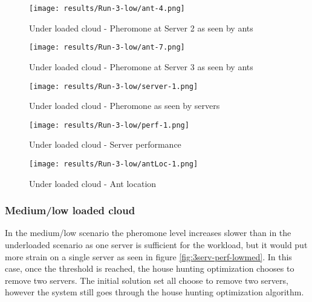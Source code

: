 \begin{figure}
	\centering
		\texttt{[image: results/Run-3-low/ant-4.png]}
	\caption{Under loaded cloud - Pheromone at Server 2 as seen by ants}
	\label{fig:3serv-ant4-low}
\end{figure}

\begin{figure}
	\centering
		\texttt{[image: results/Run-3-low/ant-7.png]}
	\caption{Under loaded cloud - Pheromone at Server 3 as seen by ants}
	\label{fig:3serv-ant7-low}
\end{figure}

\begin{figure}
	\centering
		\texttt{[image: results/Run-3-low/server-1.png]}
	\caption{Under loaded cloud - Pheromone as seen by servers}
	\label{fig:3serv-pher-low}
\end{figure}

\begin{figure}
	\centering
		\texttt{[image: results/Run-3-low/perf-1.png]}
	\caption{Under loaded cloud - Server performance}
	\label{fig:3serv-perf-low}
\end{figure}

\begin{figure}
	\centering
		\texttt{[image: results/Run-3-low/antLoc-1.png]}
	\caption{Under loaded cloud - Ant location}
	\label{fig:3serv-antloc-low}
\end{figure}

\subsubsection{Medium/low loaded cloud}

In the medium/low scenario the pheromone level increases slower than in the underloaded scenario as one server is sufficient for the workload, but it would put more strain on a single server as seen in figure \ref{fig:3serv-perf-lowmed}. In this case, once the threshold is reached, the house hunting optimization chooses to remove two servers. The initial solution set all choose to remove two servers, however the system still goes through the house hunting optimization algorithm.

